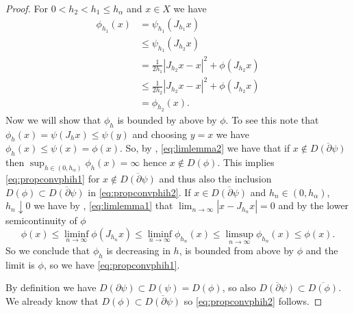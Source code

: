 \documentclass[a4paper,11pt, leqno]{scrreprt} %
\renewcommand{\leq}{\leqslant}
\renewcommand{\leq}{\leqslant}
\theoremstyle{change}
\theoremstyle{nonumberplain}
\newtheorem{proof}{Proof}
\begin{document}
\begin{proof}
 For $0 < h_2 < h_1 \leq h_\alpha$ and $x \in X$ we have
 \begin{equation*}
   \begin{split}
     \phi_{h_1}(x) &= \psi_{h_1}(J_{h_1} x)\\
     &\leq \psi_{h_1}(J_{h_2} x)\\
     &=\frac{1}{2h_1} |J_{h_2} x - x|^2 + \phi(J_{h_2} x)\\
     &\leq \frac{1}{2h_2} |J_{h_2} x - x|^2 + \phi(J_{h_2} x)\\
     &=\phi_{h_2}(x).
   \end{split}
 \end{equation*}
 Now we will show that $\phi_h$ is bounded by above by $\phi$. To see
 this note that $\phi_h(x) = \psi(J_h x) \leq \psi(y)$ and choosing $y
 = x$ we have $\phi_h(x) \leq \psi(x) = \phi(x)$. So, by
 , \eqref{eq:limlemma2} we have that if $x \notin
 \overline{D(\partial \psi)}$ then $\sup_{h \in (0, h_\alpha)}
 \phi_h(x) = \infty$ hence $x \notin D(\phi)$. This implies
 \eqref{eq:propconvphih1} for $x \notin \overline{D(\partial \psi)}$
 and thus also the inclusion $D(\phi) \subset \overline{D(\partial
   \psi)}$ in \eqref{eq:propconvphih2}.
 If $x \in \overline{D(\partial \psi)}$ and $h_n \in (0, h_\alpha)$,
 $h_n \downarrow 0$ we have by ,
 \eqref{eq:limlemma1} that $\lim_{n \to \infty} |x - J_{h_n} x| = 0$
 and by the lower semicontinuity of $\phi$
 \begin{equation*}
   \phi(x) \leq \liminf_{n \to \infty} \phi(J_{h_n} x) \leq \liminf_{n
     \to \infty} \phi_{h_n}(x) \leq \limsup_{n \to \infty}
   \phi_{h_n}(x) \leq \phi(x).
 \end{equation*}
 So we conclude that $\phi_h$ is decreasing in $h$, is bounded from
 above by $\phi$ and the limit is $\phi$, so we have
 \eqref{eq:propconvphih1}.

By definition we have $D(\partial \psi) \subset D(\psi) = D(\phi)$, so
also $\overline{D(\partial \psi)} \subset \overline{D(\phi)}$. We
already know that $D(\phi) \subset \overline{D(\partial \psi)}$ so
\eqref{eq:propconvphih2} follows.
\end{proof}
\end{document}
